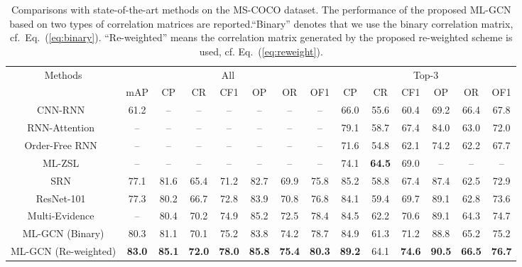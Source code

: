 \documentclass[10pt,twocolumn,letterpaper]{article}
\begin{document}
\begin{table*}[t]
\centering
\footnotesize
\caption{Comparisons with state-of-the-art methods on the MS-COCO dataset. The performance of the proposed ML-GCN  based on two types of correlation matrices are reported.``Binary'' denotes that we use the binary correlation matrix, cf.~Eq.~(\ref{eq:binary}). ``Re-weighted'' means the correlation matrix generated by the proposed re-weighted scheme is used, cf. Eq.~(\ref{eq:reweight}).}
\vspace{0.19cm}
\begin{tabular}{|c||c|c|c|c|c|c|c||c|c|c|c|c|c|}
\hline
\multirow{2}{*}{Methods} & \multicolumn{7}{c||}{{All}} & \multicolumn{6}{c|}{{Top-3}} \\
\cline{2-14} & mAP & CP & CR & CF1 & OP & OR & OF1 & CP & CR & CF1 & OP & OR & OF1 \\
\hline
\hline
CNN-RNN~\cite{cnn-rnn} & 61.2 & -- & -- & -- & -- & -- & -- & 66.0 & 55.6 & 60.4 & 69.2 & 66.4 & 67.8\\
RNN-Attention~\cite{rnn_attention} & -- & -- & -- & -- & -- & -- & -- & 79.1 & 58.7 & 67.4 & 84.0 & 63.0 & 72.0\\
Order-Free RNN~\cite{order} & -- & -- & -- & -- & -- & -- & -- & 71.6 & 54.8 & 62.1 & 74.2 & 62.2 & 67.7\\
ML-ZSL~\cite{ml-zsl} & -- & -- & -- & -- & -- & -- & -- & 74.1 & \textbf{64.5} & 69.0 & -- & -- & --\\
SRN~\cite{srn} & 77.1 & {81.6} & 65.4 & 71.2 & 82.7 & 69.9 & 75.8 & 85.2 & 58.8 & 67.4 & 87.4 & 62.5 & 72.9\\
ResNet-101~\cite{resnet} & 77.3 & 80.2 & 66.7 & 72.8 & 83.9 & 70.8 & 76.8 & 84.1 & 59.4 & 69.7 & 89.1 & 62.8 &73.6\\
Multi-Evidence~\cite{multi_evidence} & -- & 80.4 & 70.2 & 74.9 & 85.2 & 72.5 & 78.4 & 84.5 & 62.2 & 70.6 & {89.1} & 64.3 & 74.7\\
\hline
\hline
ML-GCN (Binary) & 80.3 & 81.1 & 70.1 & 75.2 & 83.8 & 74.2 & 78.7 & 84.9 & 61.3 & 71.2 & 88.8 & 65.2 & 75.2\\
ML-GCN (Re-weighted)  & \textbf{83.0} & \textbf{85.1} & \textbf{72.0} & \textbf{78.0} & \textbf{85.8} & \textbf{75.4} & \textbf{80.3} & \textbf{89.2} & 64.1 & \textbf{74.6} & \textbf{90.5} & \textbf{66.5} & \textbf{76.7}\\
\hline
\end{tabular}
\label{table:coco}
\end{table*}
\end{document}
